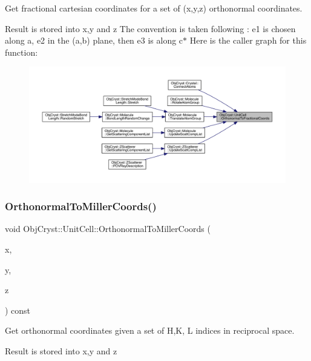 Get fractional cartesian coordinates for a set of (x,y,z) orthonormal coordinates. 

Result is stored into x,y and z The convention is taken following \+: e1 is chosen along a, e2 in the (a,b) plane, then e3 is along c$\ast$ Here is the caller graph for this function\+:
\nopagebreak
\begin{figure}[H]
\begin{center}
\leavevmode
\includegraphics[width=350pt]{class_obj_cryst_1_1_unit_cell_a69debaf9dc539baf3c5ccc599ae614cd_icgraph}
\end{center}
\end{figure}
\mbox{\label{class_obj_cryst_1_1_unit_cell_ab262e1d0d584be0fce2337729dd418f5}} 
\subsubsection{\texorpdfstring{OrthonormalToMillerCoords()}{OrthonormalToMillerCoords()}}
{\footnotesize\ttfamily void Obj\+Cryst\+::\+Unit\+Cell\+::\+Orthonormal\+To\+Miller\+Coords (\begin{DoxyParamCaption}\item[{R\+E\+AL \&}]{x,  }\item[{R\+E\+AL \&}]{y,  }\item[{R\+E\+AL \&}]{z }\end{DoxyParamCaption}) const}



Get orthonormal coordinates given a set of H,K, L indices in reciprocal space. 

Result is stored into x,y and z \mbox{\label{class_obj_cryst_1_1_unit_cell_a19ef2e012dfd628935a22b40a9c85957}} 
